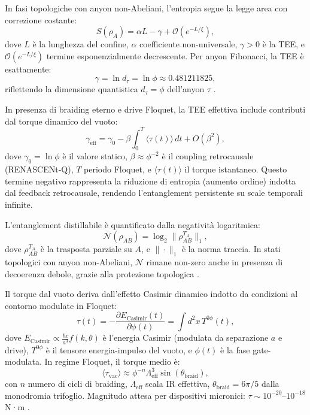 \documentclass[11pt,a4paper]{article}
\let\oldcite\cite
\renewcommand{\cite}{\protect\oldcite}
\theoremstyle{plain}
\theoremstyle{definition}
\begin{document}
In fasi topologiche con anyon non-Abeliani, l'entropia segue la legge area con correzione costante:
\begin{equation}
S(\rho_A) = \alpha L - \gamma + \mathcal{O}(e^{-L/\xi}),
\label{eq:tee_area_law}
\end{equation}
dove $L$ è la lunghezza del confine, $\alpha$ coefficiente non-universale, $\gamma > 0$ è la TEE, e $\mathcal{O}(e^{-L/\xi})$ termine esponenzialmente decrescente. Per anyon Fibonacci, la TEE è esattamente:
\begin{equation}
\gamma = \ln d_\tau = \ln \phi \approx 0.481211825,
\label{eq:tee_fibonacci}
\end{equation}
riflettendo la dimensione quantistica $d_\tau = \phi$ dell'anyon $\tau$ \cite{levin2006detecting, kitaev2006topological}.

In presenza di braiding eterno e drive Floquet, la TEE effettiva include contributi dal torque dinamico del vuoto:
\begin{equation}
\gamma_{\mathrm{eff}} = \gamma_0 - \beta \int_0^T \langle \tau(t) \rangle \, dt + O(\beta^2),
\label{eq:tee_with_torque}
\end{equation}
dove $\gamma_0 = \ln \phi$ è il valore statico, $\beta \approx \phi^{-2}$ è il coupling retrocausale (RENASCENt-Q), $T$ periodo Floquet, e $\langle \tau(t) \rangle$ il torque istantaneo. Questo termine negativo rappresenta la riduzione di entropia (aumento ordine) indotta dal feedback retrocausale, rendendo l'entanglement persistente su scale temporali infinite.

L'entanglement distillabile è quantificato dalla negatività logaritmica:
\begin{equation}
\mathcal{N}(\rho_{AB}) = \log_2 \|\rho_{AB}^{T_A}\|_1,
\label{eq:log_negativity}
\end{equation}
dove $\rho_{AB}^{T_A}$ è la trasposta parziale su $A$, e $\|\cdot\|_1$ è la norma traccia. In stati topologici con anyon non-Abeliani, $\mathcal{N}$ rimane non-zero anche in presenza di decoerenza debole, grazie alla protezione topologica \cite{vidal2002computable}.

Il torque dal vuoto deriva dall'effetto Casimir dinamico indotto da condizioni al contorno modulate in Floquet:
\begin{equation}
\tau(t) = -\frac{\partial E_{\mathrm{Casimir}}(t)}{\partial \phi(t)} = \int d^2 x \, T^{0\phi}(t),
\label{eq:vacuum_torque}
\end{equation}
dove $E_{\mathrm{Casimir}} \propto \frac{\hbar c}{a^3} f(k,\theta)$ è l'energia Casimir (modulata da separazione $a$ e drive), $T^{0\phi}$ è il tensore energia-impulso del vuoto, e $\phi(t)$ è la fase gate-modulata. In regime Floquet, il torque medio è:
\begin{equation}
\langle \tau_{\text{vac}} \rangle \approx \phi^{-n} \Lambda_{\text{eff}}^3 \sin(\theta_{\text{braid}}),
\label{eq:vac_torque_sim}
\end{equation}
con $n$ numero di cicli di braiding, $\Lambda_{\text{eff}}$ scala IR effettiva, $\theta_{\text{braid}} = 6\pi/5$ dalla monodromia trifoglio. Magnitudo attesa per dispositivi micronici: $\tau \sim 10^{-20}$--$10^{-18}$ N·m \cite{fialkovsky2018quest, dai2026vacuum, marachevsky2024casimir}.
\end{document}
